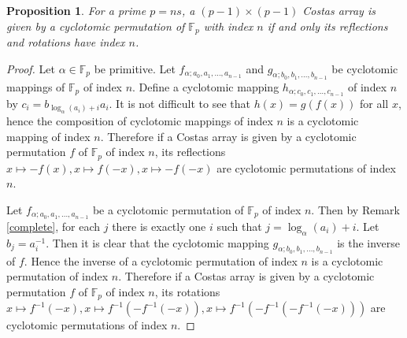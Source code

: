 \documentclass[10pt]{amsart}
\newtheorem{proposition}[theorem]{Proposition}
\begin{document}
\begin{proposition}
For a prime $p=ns$, a $(p-1) \times (p-1)$ Costas array is given by
a cyclotomic permutation of $\mathbb{F}_p$ with index $n$ if
and only its reflections and rotations have index $n$.
\end{proposition}
\begin{proof}
Let $\alpha \in \mathbb{F}_p$ be primitive.
Let $f_{\alpha;a_0,a_1,\ldots,a_{n-1}}$ and $g_{\alpha;b_0,b_1,\ldots,b_{n-1}}$ be
cyclotomic mappings
of $\mathbb{F}_p$ of
index $n$. Define
a cyclotomic mapping $h_{\alpha;c_0,c_1,\ldots,c_{n-1}}$ of index $n$
by $c_i=b_{\log_\alpha(a_i)+i}a_i$. It is not difficult to see that
$h(x)=g(f(x))$ for all $x$, hence the composition
of cyclotomic mappings of index $n$ is a cyclotomic mapping of index $n$.
Therefore if a Costas array is given by a cyclotomic permutation
$f$ of $\mathbb{F}_p$ of index $n$,
its reflections $x \mapsto -f(x), x \mapsto f(-x), x \mapsto -f(-x)$
are cyclotomic permutations of index $n$.

Let $f_{\alpha;a_0,a_1,\ldots,a_{n-1}}$ be a cyclotomic permutation of $\mathbb{F}_p$ of index $n$.
Then by Remark \ref{complete}, for each $j$ there is exactly one $i$ such
that $j=\log_\alpha(a_i)+i$. Let $b_j=a_i^{-1}$.
Then
it is clear that the cyclotomic mapping $g_{\alpha;b_0,b_1,\ldots,b_{n-1}}$
is the inverse of $f$. Hence the
inverse of a cyclotomic permutation of index $n$ is a cyclotomic permutation
of index $n$. Therefore if a Costas array is given by a cyclotomic
permutation
$f$ of $\mathbb{F}_p$ of index $n$,
its rotations $x \mapsto f^{-1}(-x), x \mapsto f^{-1}(-f^{-1}(-x)),
x \mapsto f^{-1}(-f^{-1}(-f^{-1}(-x)))$
are cyclotomic permutations of index $n$.
\end{proof}
\end{document}
